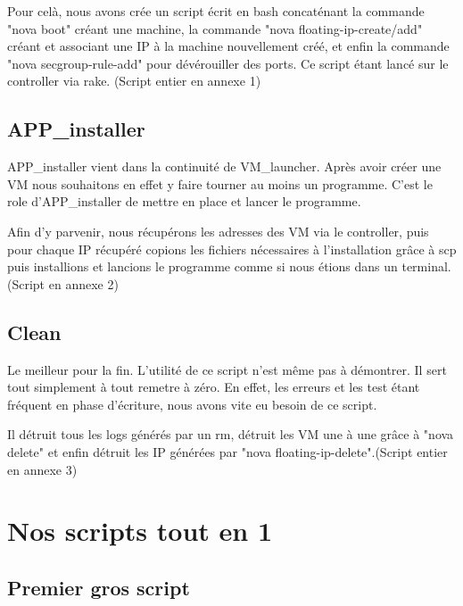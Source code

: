 \documentclass{report}
\begin{document}
        Pour celà, nous avons crée un script écrit en bash concaténant la commande "nova boot" créant une machine, la commande "nova floating-ip-create/add" créant et associant une IP à la machine nouvellement créé, et enfin la commande "nova secgroup-rule-add" pour dévérouiller des ports.
        Ce script étant lancé sur le controller via rake. (Script entier en annexe 1)
        
        \subsection{APP\_installer}
        APP\_installer vient dans la continuité de VM\_launcher. Après avoir créer une VM nous souhaitons en effet y faire tourner au moins un programme. C'est le role d'APP\_installer de mettre en place et lancer le programme. 
        
        Afin d'y parvenir, nous récupérons les adresses des VM via le controller, puis pour chaque IP récupéré copions les fichiers nécessaires  à l'installation grâce à scp puis installions et lancions le programme comme si nous étions dans un terminal. (Script en annexe 2)
        
        \subsection{Clean}
        Le meilleur pour la fin. L'utilité de ce script n'est même pas à démontrer. Il sert tout simplement à tout remetre à zéro. En effet, les erreurs et les test étant fréquent en phase d'écriture, nous avons vite eu besoin de ce script.
        
        Il détruit tous les logs générés par un rm, détruit les VM une à une grâce à "nova delete" et enfin détruit les IP générées par "nova floating-ip-delete".(Script entier en annexe 3) 
           
          
    \section{Nos scripts tout en 1}
        \subsection{Premier gros script}
            
\end{document}
